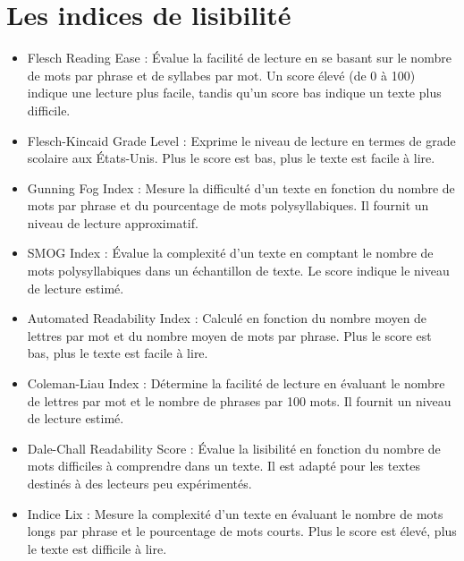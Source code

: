 \documentclass[12pt,a4paper,oneside,titlepage]{book} %
\begin{document}
	\section*{Les indices de lisibilité}
\begin{itemize}
		
	\item Flesch Reading Ease : Évalue la facilité de lecture en se basant sur le nombre de mots par phrase et de syllabes par mot. Un score élevé (de 0 à 100) indique une lecture plus facile, tandis qu'un score bas indique un texte plus difficile.
	
	\item Flesch-Kincaid Grade Level : Exprime le niveau de lecture en termes de grade scolaire aux États-Unis. Plus le score est bas, plus le texte est facile à lire.
	
	\item Gunning Fog Index : Mesure la difficulté d'un texte en fonction du nombre de mots par phrase et du pourcentage de mots polysyllabiques. Il fournit un niveau de lecture approximatif.
	
	\item SMOG Index : Évalue la complexité d'un texte en comptant le nombre de mots polysyllabiques dans un échantillon de texte. Le score indique le niveau de lecture estimé.
	
	\item Automated Readability Index : Calculé en fonction du nombre moyen de lettres par mot et du nombre moyen de mots par phrase. Plus le score est bas, plus le texte est facile à lire.
	
	\item Coleman-Liau Index : Détermine la facilité de lecture en évaluant le nombre de lettres par mot et le nombre de phrases par 100 mots. Il fournit un niveau de lecture estimé.
	
	\item Dale-Chall Readability Score : Évalue la lisibilité en fonction du nombre de mots difficiles à comprendre dans un texte. Il est adapté pour les textes destinés à des lecteurs peu expérimentés.
	
	\item Indice Lix : Mesure la complexité d'un texte en évaluant le nombre de mots longs par phrase et le pourcentage de mots courts. Plus le score est élevé, plus le texte est difficile à lire.


\end{itemize}	
\end{document}
